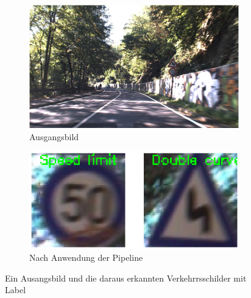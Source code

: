 \documentclass[runningheads]{llncs}
\begin{document}
\begin{figure}[H]
    \centering
    \begin{subfigure}{0.49\textwidth}
        \centering
        \includegraphics[width=\linewidth]{images/00004.jpg}
        \caption{Ausgangsbild}
        \label{fig6original}
    \end{subfigure}
    \hfill
    \begin{subfigure}{0.49\textwidth}
        \centering
        \includegraphics[width=\linewidth]{images/recognized_signs.png}
        \caption{Nach Anwendung der Pipeline}
        \label{fig6result}
    \end{subfigure}
    \caption{Ein Ausangsbild und die daraus erkannten Verkehrrsschilder mit Label}
    \label{fig6}
\end{figure}


\end{document}
